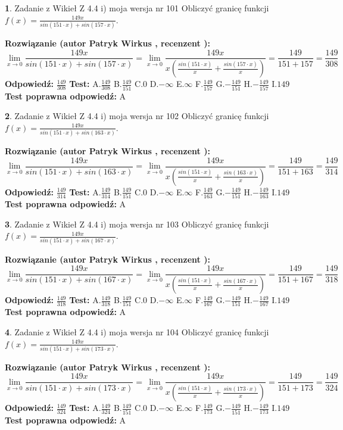 \documentclass[12pt, a4paper]{article}
\theoremstyle{definition} %
\newtheorem{zad}{}
\newcommand{\zadStart}[1]{\begin{zad}#1\newline}
\newcommand{\zadStop}{\end{zad}}
\newcommand{\rozwStart}[2]{\noindent \textbf{Rozwiązanie (autor #1 , recenzent #2): }\newline}
\newcommand{\rozwStop}{\newline}
\newcommand{\odpStart}{\noindent \textbf{Odpowiedź:}\newline}
\newcommand{\odpStop}{\newline}
\newcommand{\testStart}{\noindent \textbf{Test:}\newline}
\newcommand{\testStop}{\newline}
\newcommand{\kluczStart}{\noindent \textbf{Test poprawna odpowiedź:}\newline}
\newcommand{\kluczStop}{\newline}
\begin{document}
\zadStart{Zadanie z Wikieł Z 4.4 i) moja wersja nr 101}
Obliczyć granicę funkcji $f(x)=\frac{149x}{sin(151\cdot x) +sin(157\cdot x)}$.
\zadStop
\rozwStart{Patryk Wirkus}{}
$$\lim\limits_{x\to 0}\frac{149x}{sin(151\cdot x) +sin(157\cdot x)}=\lim\limits_{x\to 0}\frac{149x}{x(\frac{sin(151\cdot x)}{x}+\frac{sin(157\cdot x)}{x})}=\frac{149}{151+157} = \frac{149}{308}$$
\rozwStop
\odpStart
$\frac{149}{308}$
\odpStop
\testStart
A.$\frac{149}{308}$
B.$\frac{149}{151}$
C.$0$
D.$-\infty$
E.$\infty$
F.$\frac{149}{157}$
G.$-\frac{149}{151}$
H.$-\frac{149}{157}$
I.$149$
\testStop
\kluczStart
A
\kluczStop



\zadStart{Zadanie z Wikieł Z 4.4 i) moja wersja nr 102}
Obliczyć granicę funkcji $f(x)=\frac{149x}{sin(151\cdot x) +sin(163\cdot x)}$.
\zadStop
\rozwStart{Patryk Wirkus}{}
$$\lim\limits_{x\to 0}\frac{149x}{sin(151\cdot x) +sin(163\cdot x)}=\lim\limits_{x\to 0}\frac{149x}{x(\frac{sin(151\cdot x)}{x}+\frac{sin(163\cdot x)}{x})}=\frac{149}{151+163} = \frac{149}{314}$$
\rozwStop
\odpStart
$\frac{149}{314}$
\odpStop
\testStart
A.$\frac{149}{314}$
B.$\frac{149}{151}$
C.$0$
D.$-\infty$
E.$\infty$
F.$\frac{149}{163}$
G.$-\frac{149}{151}$
H.$-\frac{149}{163}$
I.$149$
\testStop
\kluczStart
A
\kluczStop



\zadStart{Zadanie z Wikieł Z 4.4 i) moja wersja nr 103}
Obliczyć granicę funkcji $f(x)=\frac{149x}{sin(151\cdot x) +sin(167\cdot x)}$.
\zadStop
\rozwStart{Patryk Wirkus}{}
$$\lim\limits_{x\to 0}\frac{149x}{sin(151\cdot x) +sin(167\cdot x)}=\lim\limits_{x\to 0}\frac{149x}{x(\frac{sin(151\cdot x)}{x}+\frac{sin(167\cdot x)}{x})}=\frac{149}{151+167} = \frac{149}{318}$$
\rozwStop
\odpStart
$\frac{149}{318}$
\odpStop
\testStart
A.$\frac{149}{318}$
B.$\frac{149}{151}$
C.$0$
D.$-\infty$
E.$\infty$
F.$\frac{149}{167}$
G.$-\frac{149}{151}$
H.$-\frac{149}{167}$
I.$149$
\testStop
\kluczStart
A
\kluczStop



\zadStart{Zadanie z Wikieł Z 4.4 i) moja wersja nr 104}
Obliczyć granicę funkcji $f(x)=\frac{149x}{sin(151\cdot x) +sin(173\cdot x)}$.
\zadStop
\rozwStart{Patryk Wirkus}{}
$$\lim\limits_{x\to 0}\frac{149x}{sin(151\cdot x) +sin(173\cdot x)}=\lim\limits_{x\to 0}\frac{149x}{x(\frac{sin(151\cdot x)}{x}+\frac{sin(173\cdot x)}{x})}=\frac{149}{151+173} = \frac{149}{324}$$
\rozwStop
\odpStart
$\frac{149}{324}$
\odpStop
\testStart
A.$\frac{149}{324}$
B.$\frac{149}{151}$
C.$0$
D.$-\infty$
E.$\infty$
F.$\frac{149}{173}$
G.$-\frac{149}{151}$
H.$-\frac{149}{173}$
I.$149$
\testStop
\kluczStart
A
\kluczStop
\end{document}
